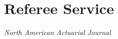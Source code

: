 \documentclass[12pt,letterpaper]{report}
\newcommand{\listitemspace}{0.15em}
\renewenvironment{itemize}
{\begin{list}{}{\setlength{\leftmargin}{0em}
            \setlength{\parskip}{0em}
            \setlength{\itemsep}{\listitemspace}
            \setlength{\parsep}{\listitemspace}}}
    {\end{list}}
\begin{document}
    \section*{Referee Service}


    \begin{itemize}
        
        \item \textit{North American Actuarial Journal}

\end{itemize}
\end{document}
